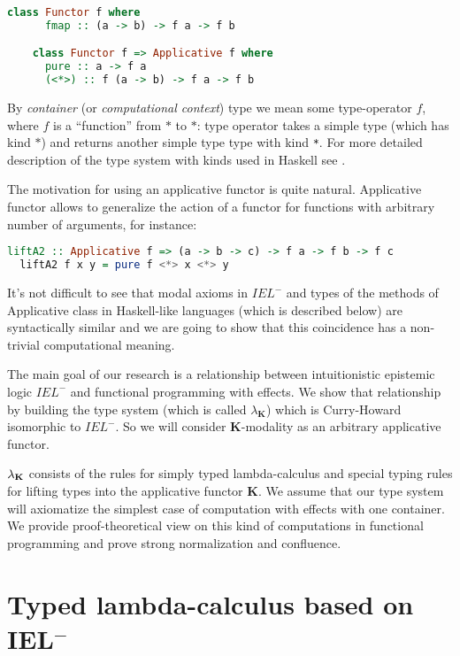 \documentclass[a4paper]{article}
\begin{document}
  \begin{lstlisting}[language=Haskell]
    class Functor f where
      fmap :: (a -> b) -> f a -> f b

    class Functor f => Applicative f where
      pure :: a -> f a
      (<*>) :: f (a -> b) -> f a -> f b
  \end{lstlisting}

  By \emph{container} (or \emph{computational context}) type we mean some type-operator $f$, where $f$ is a
  ``function'' from $*$ to $*$: type operator takes a simple type (which has kind $*$) and returns another
  simple type type with kind \verb"*". For more detailed description of the type system with kinds used in
  Haskell see \cite{Morten}.

  The motivation for using an applicative functor is quite natural. Applicative functor allows to generalize the action of a functor for functions with arbitrary number of arguments, for instance:
  \begin{lstlisting}[language=Haskell]
  liftA2 :: Applicative f => (a -> b -> c) -> f a -> f b -> f c
  liftA2 f x y = pure f <*> x <*> y
  \end{lstlisting}

  It's not difficult to see that modal axioms in $IEL^{-}$ and types of the methods of Applicative class in
  Haskell-like languages (which is described below) are syntactically similar and we are going to show that
  this coincidence has a non-trivial computational meaning.

  The main goal of our research is a relationship between intuitionistic epistemic logic $IEL^{-}$ and
  functional programming with effects. We show that relationship by building the type system (which is called $\lambda_{\textbf{K}}$) which is Curry-Howard isomorphic to $IEL^{-}$. So we will consider $\textbf{K}$-modality as an arbitrary applicative functor.

  $\lambda_{{\bf K}}$ consists of the rules for simply typed lambda-calculus and special typing rules for
  lifting types into the applicative functor $\textbf{K}$. We assume that our type system will
  axiomatize the simplest case of computation with effects with one container. We provide proof-theoretical
  view on
  this kind of computations in functional programming and prove strong normalization and confluence.

  \section{Typed lambda-calculus based on IEL$^{-}$}
\end{document}
